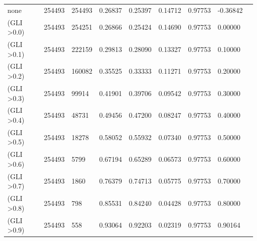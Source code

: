 \documentclass[drones,technicalnote,accept,pdftex,moreauthors]{Definitions/mdpi}
\begin{document}
\begin{table}[H]
\begin{tabular}{lllllllll}
none                   & 254493          & 254493                            & 0.26837            & 0.25397              & 0.14712           & 0.97753           & -0.36842          \\
(GLI \textgreater 0.0) & 254493          & 254251                            & 0.26866            & 0.25424              & 0.14690           & 0.97753           & 0.00000           \\
(GLI \textgreater 0.1) & 254493          & 222159                            & 0.29813            & 0.28090              & 0.13327           & 0.97753           & 0.10000           \\
(GLI \textgreater 0.2) & 254493          & 160082                            & 0.35525            & 0.33333              & 0.11271           & 0.97753           & 0.20000           \\
(GLI \textgreater 0.3) & 254493          & 99914                             & 0.41901            & 0.39706              & 0.09542           & 0.97753           & 0.30000           \\
(GLI \textgreater 0.4) & 254493          & 48731                             & 0.49456            & 0.47200              & 0.08247           & 0.97753           & 0.40000           \\
(GLI \textgreater 0.5) & 254493          & 18278                             & 0.58052            & 0.55932              & 0.07340           & 0.97753           & 0.50000           \\
(GLI \textgreater 0.6) & 254493          & 5799                              & 0.67194            & 0.65289              & 0.06573           & 0.97753           & 0.60000           \\
(GLI \textgreater 0.7) & 254493          & 1860                              & 0.76379            & 0.74713              & 0.05775           & 0.97753           & 0.70000           \\
(GLI \textgreater 0.8) & 254493          & 798                               & 0.85531            & 0.84240              & 0.04428           & 0.97753           & 0.80000           \\
(GLI \textgreater 0.9) & 254493          & 558                               & 0.93064            & 0.92203              & 0.02319           & 0.97753           & 0.90164\\

\hline
\end{tabular}

\end{table}
\end{document}
